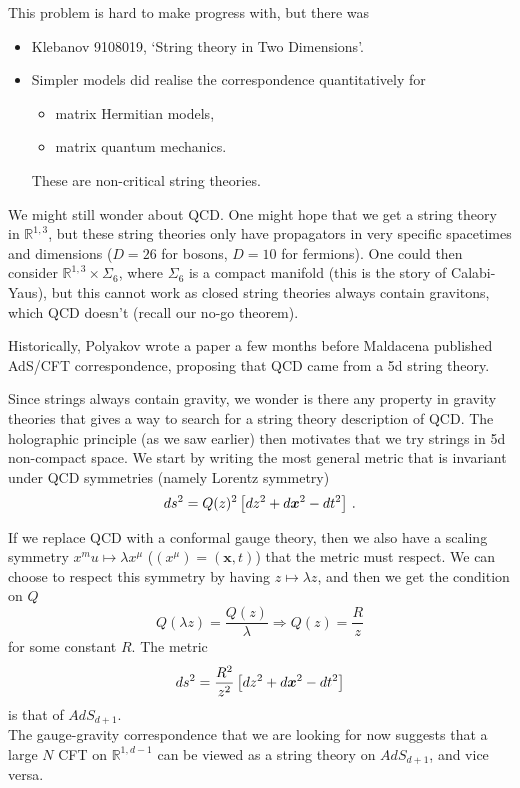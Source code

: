 \documentclass{article}
\begin{document}
This problem is hard to make progress with, but there was 
\begin{itemize}
	\item Klebanov 9108019, `String theory in Two Dimensions'. 
	\item Simpler models did realise the correspondence quantitatively for 
	\begin{itemize}
		\item matrix Hermitian models,
		\item matrix quantum mechanics. 
	\end{itemize}
These are non-critical string theories. 
\end{itemize}
We might still wonder about QCD. One might hope that we get a string theory in $\mathbb{R}^{1,3}$, but these string theories only have propagators in very specific spacetimes and dimensions ($D=26$ for bosons, $D=10$ for fermions). One could then consider $\mathbb{R}^{1,3} \times \Sigma_6$, where $\Sigma_6$ is a compact manifold (this is the story of Calabi-Yaus), but this cannot work as closed string theories always contain gravitons, which QCD doesn't (recall our no-go theorem). 
\begin{remark}
	Historically, Polyakov wrote a paper a few months before Maldacena published AdS/CFT correspondence, proposing that QCD came from a 5d string theory. 
\end{remark} 
Since strings always contain gravity, we wonder is there any property in gravity theories that gives a way to search for a string theory description of QCD. The holographic principle (as we saw earlier) then motivates that we try strings in 5d non-compact space. We start by writing the most general metric that is invariant under QCD symmetries (namely Lorentz symmetry)
\[
ds^2 = Q(z)^2 \left[ dz^2 + d\bm{x}^2 - dt^2 \right] \, .
\]
\begin{remark}
	If we replace QCD with a conformal gauge theory, then we also have a scaling symmetry $x^mu \mapsto \lambda x^\mu$ ($(x^\mu) = (\bm{x}, t)$) that the metric must respect. We can choose to respect this symmetry by having $z \mapsto \lambda z$, and then we get the condition on $Q$ 
	\[
	Q(\lambda z) = \frac{Q(z)}{\lambda} \Rightarrow Q(z) = \frac{R}{z}
	\]
	for some constant $R$. The metric 
	\[
	ds^2 = \frac{R^2}{z^2} \left[ dz^2 + d\bm{x}^2 - dt^2 \right]
	\]
	is that of $AdS_{d+1}$. \\
	The gauge-gravity correspondence that we are looking for now suggests that a large $N$ CFT on $\mathbb{R}^{1, d-1}$ can be viewed as a string theory on $AdS_{d+1}$, and vice versa. 
\end{remark}
\end{document}
